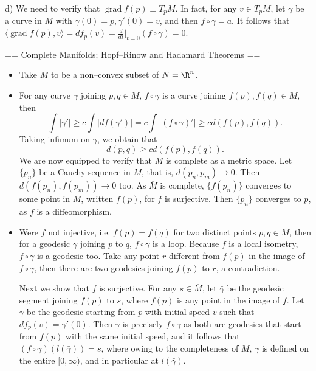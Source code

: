 \begin{itemize}
    d) We need to verify that $\operatorname{grad}f(p)\perp T_pM$. 
    In fact, for any $v\in T_pM$, let $\gamma$ be a curve in $M$ 
    with $\gamma(0)=p,\gamma'(0)=v$, and then $f\circ\gamma=a$. 
    It follows that $\langle\operatorname{grad}f(p),v\rangle=df_p(v)
    =\frac{d}{dt}\big|_{t=0}(f\circ\gamma)=0$.
\end{itemize}

== Complete Manifolds; Hopf--Rinow and Hadamard Theorems ==

\begin{itemize}
    \item[1.] Take $M$ to be a non--convex subset of $N=\R^n$.

    \item[7.] For any curve $\gamma$ joining $p,q\in M$, 
    $f\circ\gamma$ is a curve joining $f(p),f(q)\in\overline{M}$, then
    \[\int|\gamma'|\ge c\int|df(\gamma')|
    =c\int|(f\circ\gamma)'|\ge cd(f(p),f(q)).\]
    Taking infimum on $\gamma$, we obtain that
    \[d(p,q)\ge cd(f(p),f(q)).\]
    We are now equipped to verify that $M$ is complete as a metric space. 
    Let $\{p_n\}$ be a Cauchy sequence in $M$, that is, $d(p_n,p_m)\to0$. 
    Then $d(f(p_n),f(p_m))\to0$ too. As $\overline{M}$ is complete, 
    $\{f(p_n)\}$ converges to some point in $\overline{M}$, 
    written $f(p)$, for $f$ is surjective. 
    Then $\{p_n\}$ converges to $p$, as $f$ is a diffeomorphism.

    \item[8.] Were $f$ not injective, i.e. $f(p)=f(q)$ 
    for two distinct points $p,q\in M$, then for a geodesic $\gamma$ 
    joining $p$ to $q$, $f\circ\gamma$ is a loop. 
    Because $f$ is a local isometry, $f\circ\gamma$ is a geodesic too. 
    Take any point $r$ different from $f(p)$ in the image of $f\circ\gamma$, 
    then there are two geodesics joining $f(p)$ to $r$, a contradiction.

    Next we show that $f$ is surjective. For any $s\in\overline{M}$, 
    let $\bar{\gamma}$ be the geodesic segment joining $f(p)$ to $s$, 
    where $f(p)$ is any point in the image of $f$. 
    Let $\gamma$ be the geodesic starting from $p$ with initial speed $v$ 
    such that $df_p(v)=\bar{\gamma}'(0)$. 
    Then $\bar{\gamma}$ is precisely $f\circ\gamma$ 
    as both are geodesics that start from $f(p)$ with the same initial speed, 
    and it follows that $(f\circ\gamma)(l(\bar{\gamma}))=s$, 
    where owing to the completeness of $M$, $\gamma$ is defined 
    on the entire $[0,\infty)$, and in particular at $l(\bar{\gamma})$.


\end{itemize}
